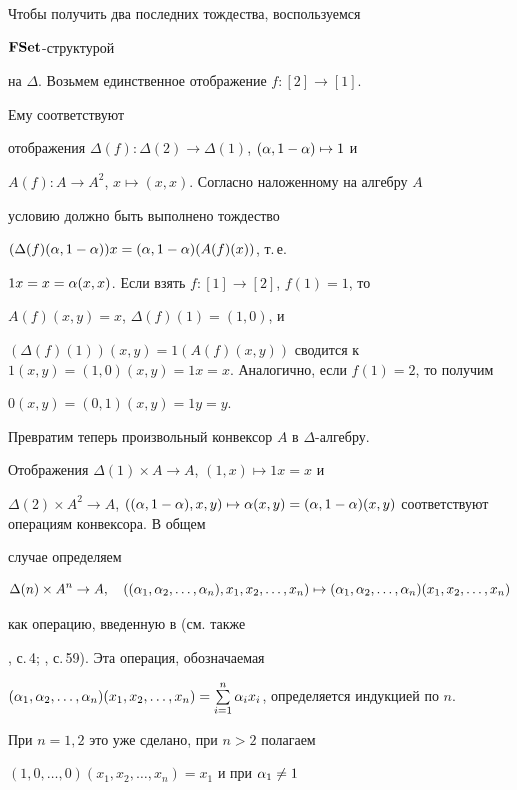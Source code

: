 \begin{pf}
Чтобы получить два последних тождества, воспользуемся


${\bold F}\bold{Set}$-структурой


на $\Delta$. Возьмем единственное отображение $f:[2]\to [1]$.


Ему соответствуют


отображения $\Delta(f): \Delta(2)\to\Delta(1)$, $(\alpha,1-\alpha)\mapsto 1$ и


$A(f):A\to A^2$, $x\mapsto (x,x)$. Согласно наложенному на алгебру $A$


условию должно быть выполнено тождество


$(\Delta(f)(\alpha,1-\alpha))x=(\alpha,1-\alpha)(A(f)(x))$, т.\,е.


$1 x=x=\alpha(x,x)$. Если взять $f:[1]\to [2]$, $f(1)=1$, то


$A(f)(x,y)=x$, $\Delta(f)(1)=(1,0)$, и


$(\Delta(f)(1))(x,y)=1(A(f)(x,y))$ сводится к $1(x,y)=(1,0)(x,y)=


1 x=x$. Аналогично, если $f(1)=2$, то получим


$0(x,y)=(0,1)(x,y)=1 y=y$.





Превратим теперь произвольный конвексор $A$ в $\Delta$-алгебру.


Отображения $\Delta(1)\times A\to A$, $(1,x)\mapsto 1 x=x$ и


$\Delta(2)\times A^2\to A$, $((\al,1-\al),x,y)\mapsto \al(x,y)=


(\al,1-\al)(x,y)$ соответствуют операциям конвексора. В общем


случае определяем


$$


\Delta(n)\times A^n\to A,\quad


((\al_1,\al_2,\dotsc,\al_n),x_1,x_2,\dotsc,x_n)\mapsto


(\al_1,\al_2,\dotsc,\al_n)(x_1,x_2,\dotsc,x_n)


$$


как операцию, введенную в \cite{Sc3} (см. также


\cite{Sc1}, с.\,4; \cite{Sc2}, с.\,59). Эта операция, обозначаемая


$(\al_1,\al_2,\dotsc,\al_n)(x_1,x_2,\dotsc,x_n)=


\sum\limits_{i=1}^n \al_i x_i$, определяется индукцией по $n$.


При $n=1,2$ это уже сделано, при $n>2$ полагаем


$(1,0,\dotsc,0)(x_1,x_2,\dotsc,x_n)=x_1$ и при $\alpha_1\neq 1$ \quad



\end{pf}
